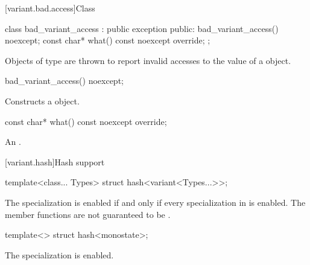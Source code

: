 %
[variant.bad.access]{Class }

\begin{codeblock}
class bad_variant_access : public exception {
public:
  bad_variant_access() noexcept;
  const char* what() const noexcept override;
};
\end{codeblock}

\pnum
Objects of type  are thrown to report invalid
accesses to the value of a  object.

%
\begin{itemdecl}
bad_variant_access() noexcept;
\end{itemdecl}

\begin{itemdescr}
\pnum
Constructs a  object.
\end{itemdescr}

%
\begin{itemdecl}
const char* what() const noexcept override;
\end{itemdecl}

\begin{itemdescr}
\pnum
\returns An  \ntbs{}.
\end{itemdescr}

[variant.hash]{Hash support}

%
\begin{itemdecl}
template<class... Types> struct hash<variant<Types...>>;
\end{itemdecl}

\begin{itemdescr}
\pnum
The specialization  is enabled
if and only if every specialization in  is enabled.
The member functions are not guaranteed to be .
\end{itemdescr}

%
\begin{itemdecl}
template<> struct hash<monostate>;
\end{itemdecl}

\begin{itemdescr}
\pnum
The specialization is enabled.
\end{itemdescr}


